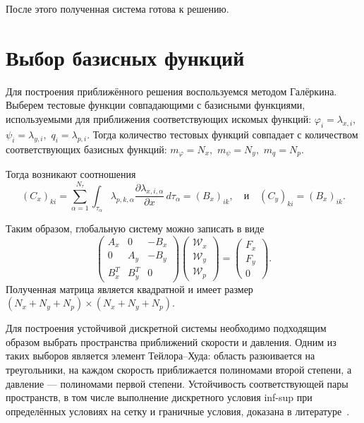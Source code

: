 \documentclass[a4paper,14pt]{extarticle}
\begin{document}
После этого полученная система готова к решению.




\section{Выбор базисных функций}

Для построения приближённого решения воспользуемся методом
Галёркина. Выберем тестовые функции совпадающими с базисными
функциями, используемыми для приближения соответствующих
искомых функций:
$
	\varphi_i=\lambda_{x,i},
$ 
$
\psi_i=\lambda_{y,i},
$
$
	q_i=\lambda_{p,i}.
$
Тогда количество тестовых функций совпадает с количеством
соответствующих базисных функций:
$
	m_\varphi=N_x,
$
$
	m_\psi=N_y,
$
$
	m_q=N_p.
$

Тогда возникают соотношения
\begin{equation}
		(C_x)_{ki}
		=
		\sum_{\alpha=1}^{N_\tau}
		\int_{\tau_\alpha}
		\lambda_{p,k,\alpha}
		\frac{\partial\lambda_{x,i,\alpha}}{\partial x}
		\,d\tau_\alpha
		=
		(B_x)_{ik},
		\quad
		\text{и}
		\quad
		(C_y)_{ki} = (B_x)_{ik}.
\end{equation}

Таким образом, глобальную систему можно записать в виде
\begin{equation}
	\begin{pmatrix}
		A_x & 0 & -B_x\\
		0 & A_y & -B_y\\
		B_x^T & B_y^T & 0
	\end{pmatrix}
	\begin{pmatrix}
		\mathcal W_x\\
		\mathcal W_y\\
		\mathcal W_p
	\end{pmatrix}
	=
	\begin{pmatrix}
		F_x\\
		F_y\\
		0
	\end{pmatrix}.
\end{equation}
Полученная матрица является квадратной и имеет размер
$(N_x+N_y+N_p)\times(N_x+N_y+N_p)$.

Для построения устойчивой дискретной системы необходимо
подходящим образом выбрать пространства приближений скорости
и давления. Одним из таких выборов является элемент
Тейлора--Худа: область разюивается на треугольники, на каждом скорость приближается полиномами второй степени, а давление --- полиномами первой
степени. Устойчивость соответствующей пары пространств,
в том числе выполнение дискретного условия inf-sup при
определённых условиях на сетку и граничные условия,
доказана в литературе~\cite{taylor_hood}.
\end{document}
